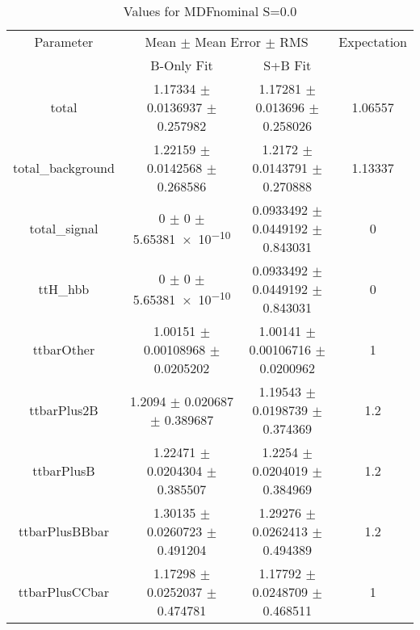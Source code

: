\begin{table}
\centering
\caption{Values for MDFnominal S=0.0}
\begin{tabular}{cccc}
\toprule
Parameter & \multicolumn{2}{c}{Mean $\pm$ Mean Error $\pm$ RMS} & Expectation\\
 & B-Only Fit & S+B Fit & \\
\midrule
total & \num{1.17334} $\pm$ \num{0.0136937} $\pm$ \num{0.257982} & \num{1.17281} $\pm$ \num{0.013696} $\pm$ \num{0.258026} & \num{1.06557}\\
total\_background & \num{1.22159} $\pm$ \num{0.0142568} $\pm$ \num{0.268586} & \num{1.2172} $\pm$ \num{0.0143791} $\pm$ \num{0.270888} & \num{1.13337}\\
total\_signal & \num{0} $\pm$ \num{0} $\pm$ \num{5.65381e-10} & \num{0.0933492} $\pm$ \num{0.0449192} $\pm$ \num{0.843031} & \num{0}\\
ttH\_hbb & \num{0} $\pm$ \num{0} $\pm$ \num{5.65381e-10} & \num{0.0933492} $\pm$ \num{0.0449192} $\pm$ \num{0.843031} & \num{0}\\
ttbarOther & \num{1.00151} $\pm$ \num{0.00108968} $\pm$ \num{0.0205202} & \num{1.00141} $\pm$ \num{0.00106716} $\pm$ \num{0.0200962} & \num{1}\\
ttbarPlus2B & \num{1.2094} $\pm$ \num{0.020687} $\pm$ \num{0.389687} & \num{1.19543} $\pm$ \num{0.0198739} $\pm$ \num{0.374369} & \num{1.2}\\
ttbarPlusB & \num{1.22471} $\pm$ \num{0.0204304} $\pm$ \num{0.385507} & \num{1.2254} $\pm$ \num{0.0204019} $\pm$ \num{0.384969} & \num{1.2}\\
ttbarPlusBBbar & \num{1.30135} $\pm$ \num{0.0260723} $\pm$ \num{0.491204} & \num{1.29276} $\pm$ \num{0.0262413} $\pm$ \num{0.494389} & \num{1.2}\\
ttbarPlusCCbar & \num{1.17298} $\pm$ \num{0.0252037} $\pm$ \num{0.474781} & \num{1.17792} $\pm$ \num{0.0248709} $\pm$ \num{0.468511} & \num{1}\\
\bottomrule
\end{tabular}
\end{table}